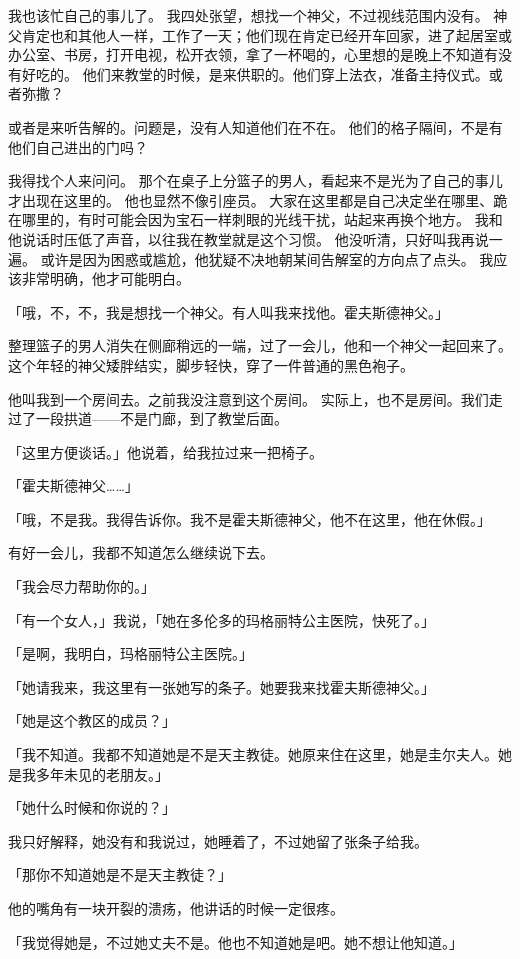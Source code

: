 \documentclass[UTF8]{ctexart}
\begin{document}
我也该忙自己的事儿了。
我四处张望，想找一个神父，不过视线范围内没有。
神父肯定也和其他人一样，工作了一天；他们现在肯定已经开车回家，进了起居室或办公室、书房，打开电视，松开衣领，拿了一杯喝的，心里想的是晚上不知道有没有好吃的。
他们来教堂的时候，是来供职的。他们穿上法衣，准备主持仪式。或者弥撒？

或者是来听告解的。问题是，没有人知道他们在不在。
他们的格子隔间，不是有他们自己进出的门吗？

我得找个人来问问。
那个在桌子上分篮子的男人，看起来不是光为了自己的事儿才出现在这里的。
他也显然不像引座员。
大家在这里都是自己决定坐在哪里、跪在哪里的，有时可能会因为宝石一样刺眼的光线干扰，站起来再换个地方。
我和他说话时压低了声音，以往我在教堂就是这个习惯。
他没听清，只好叫我再说一遍。
或许是因为困惑或尴尬，他犹疑不决地朝某间告解室的方向点了点头。
我应该非常明确，他才可能明白。

「哦，不，不，我是想找一个神父。有人叫我来找他。霍夫斯德神父。」

整理篮子的男人消失在侧廊稍远的一端，过了一会儿，他和一个神父一起回来了。
这个年轻的神父矮胖结实，脚步轻快，穿了一件普通的黑色袍子。

他叫我到一个房间去。之前我没注意到这个房间。
实际上，也不是房间。我们走过了一段拱道——不是门廊，到了教堂后面。

「这里方便谈话。」他说着，给我拉过来一把椅子。

「霍夫斯德神父……」

「哦，不是我。我得告诉你。我不是霍夫斯德神父，他不在这里，他在休假。」

有好一会儿，我都不知道怎么继续说下去。

「我会尽力帮助你的。」

「有一个女人，」我说，「她在多伦多的玛格丽特公主医院，快死了。」

「是啊，我明白，玛格丽特公主医院。」

「她请我来，我这里有一张她写的条子。她要我来找霍夫斯德神父。」

「她是这个教区的成员？」

「我不知道。我都不知道她是不是天主教徒。她原来住在这里，她是圭尔夫人。她是我多年未见的老朋友。」

「她什么时候和你说的？」

我只好解释，她没有和我说过，她睡着了，不过她留了张条子给我。

「那你不知道她是不是天主教徒？」

他的嘴角有一块开裂的溃疡，他讲话的时候一定很疼。

「我觉得她是，不过她丈夫不是。他也不知道她是吧。她不想让他知道。」
\end{document}

